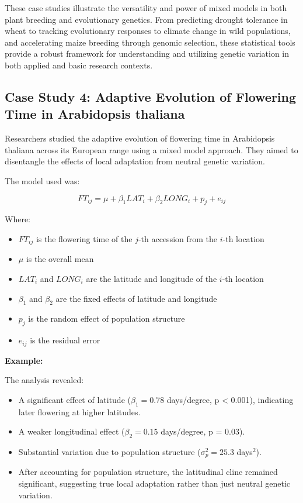 \documentclass[12pt,a4paper]{article}
\newenvironment{example}[1][]
{\begin{basebox}[linecolor=uqgold]
\textbf{\color{uqgold}Example:} \textit{#1}\par\noindent\ignorespaces}
{\end{basebox}}
\begin{document}
These case studies illustrate the versatility and power of mixed models in both plant breeding and evolutionary genetics. From predicting drought tolerance in wheat to tracking evolutionary responses to climate change in wild populations, and accelerating maize breeding through genomic selection, these statistical tools provide a robust framework for understanding and utilizing genetic variation in both applied and basic research contexts.

\subsection{Case Study 4: Adaptive Evolution of Flowering Time in Arabidopsis thaliana}

Researchers studied the adaptive evolution of flowering time in Arabidopsis thaliana across its European range using a mixed model approach. They aimed to disentangle the effects of local adaptation from neutral genetic variation.

The model used was:

\[
FT_{ij} = \mu + \beta_1 LAT_i + \beta_2 LONG_i + p_j + e_{ij}
\]

Where:
\begin{itemize}
    \item $FT_{ij}$ is the flowering time of the $j$-th accession from the $i$-th location
    \item $\mu$ is the overall mean
    \item $LAT_i$ and $LONG_i$ are the latitude and longitude of the $i$-th location
    \item $\beta_1$ and $\beta_2$ are the fixed effects of latitude and longitude
    \item $p_j$ is the random effect of population structure
    \item $e_{ij}$ is the residual error
\end{itemize}

\begin{example}
The analysis revealed:
\begin{itemize}
    \item A significant effect of latitude ($\beta_1 = 0.78$ days/degree, p < 0.001), indicating later flowering at higher latitudes.
    \item A weaker longitudinal effect ($\beta_2 = 0.15$ days/degree, p = 0.03).
    \item Substantial variation due to population structure ($\sigma^2_p = 25.3$ days$^2$).
    \item After accounting for population structure, the latitudinal cline remained significant, suggesting true local adaptation rather than just neutral genetic variation.
\end{itemize}
\end{example}
\end{document}
